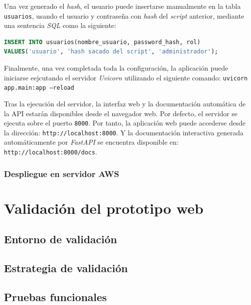 \documentclass[12pt,a4paper]{report}
\begin{document}
Una vez generado el \emph{hash}, el usuario puede insertarse manualmente en la tabla \texttt{usuarios}, usando el usuario y contraseña con \emph{hash} del  \emph{script} anterior, mediante una sentencia \emph{SQL} como la siguiente:

\begin{lstlisting}[language=SQL, caption={Inserción manual de un usuario}]
INSERT INTO usuarios(nombre_usuario, password_hash, rol)
VALUES('usuario', 'hash sacado del script', 'administrador');
\end{lstlisting}

Finalmente, una vez completada toda la configuración, la aplicación puede iniciarse eejcutando el servidor \emph{Uvicorn} utilizando el siguiente comando: \texttt{uvicorn app.main:app --reload}

Tras la ejecución del servidor, la interfaz web y la documentación automática de la API estarán disponibles desde el navegador web. Por defecto, el servidor se ejecuta sobre el puerto \texttt{8000}. Por tanto, la aplicación web puede accederse desde la dirección: \texttt{http://localhost:8000}. Y la documentación interactiva generada automáticamente por \emph{FastAPI} se encuentra disponible en: \texttt{http://localhost:8000/docs}.


\subsection{Despliegue en servidor AWS}





\chapter{Validación del prototipo web}



\section{Entorno de validación}



\section{Estrategia de validación}



\section{Pruebas funcionales}
\end{document}
